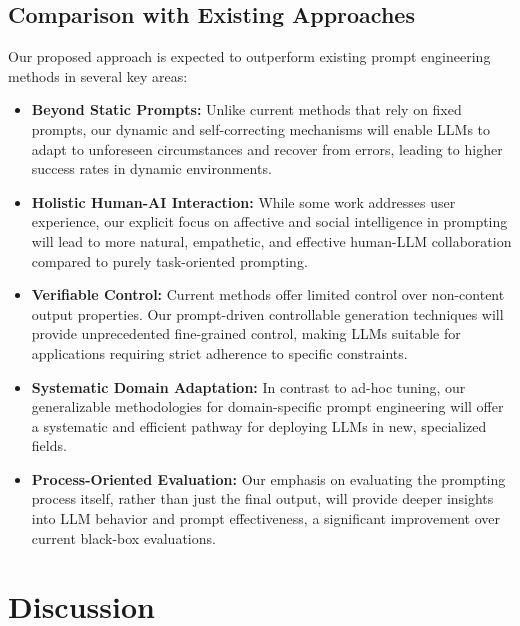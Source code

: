 \documentclass{article}
\begin{document}
\subsection{Comparison with Existing Approaches}
Our proposed approach is expected to outperform existing prompt engineering methods in several key areas:
\begin{itemize}
    \item \textbf{Beyond Static Prompts:} Unlike current methods that rely on fixed prompts, our dynamic and self-correcting mechanisms will enable LLMs to adapt to unforeseen circumstances and recover from errors, leading to higher success rates in dynamic environments.
    \item \textbf{Holistic Human-AI Interaction:} While some work addresses user experience, our explicit focus on affective and social intelligence in prompting will lead to more natural, empathetic, and effective human-LLM collaboration compared to purely task-oriented prompting.
    \item \textbf{Verifiable Control:} Current methods offer limited control over non-content output properties. Our prompt-driven controllable generation techniques will provide unprecedented fine-grained control, making LLMs suitable for applications requiring strict adherence to specific constraints.
    \item \textbf{Systematic Domain Adaptation:} In contrast to ad-hoc tuning, our generalizable methodologies for domain-specific prompt engineering will offer a systematic and efficient pathway for deploying LLMs in new, specialized fields.
\item \textbf{Process-Oriented Evaluation:} Our emphasis on evaluating the prompting process itself, rather than just the final output, will provide deeper insights into LLM behavior and prompt effectiveness, a significant improvement over current black-box evaluations.
\end{itemize}

\section{Discussion}
\end{document}
